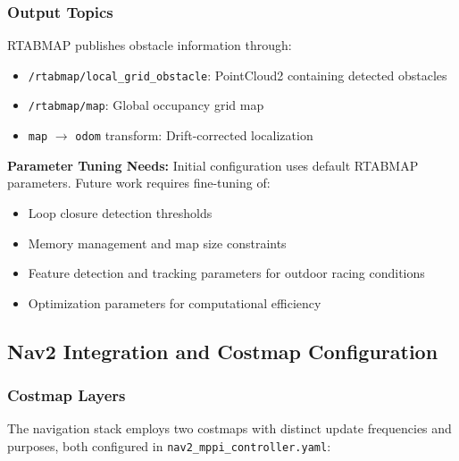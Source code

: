 \subsubsection{Output Topics}
RTABMAP publishes obstacle information through:
\begin{itemize}
    \item \texttt{/rtabmap/local\_grid\_obstacle}: PointCloud2 containing detected obstacles
    \item \texttt{/rtabmap/map}: Global occupancy grid map
    \item \texttt{map} $\rightarrow$ \texttt{odom} transform: Drift-corrected localization
\end{itemize}

\textbf{Parameter Tuning Needs:} Initial configuration uses default RTABMAP parameters. Future work requires fine-tuning of:
\begin{itemize}
    \item Loop closure detection thresholds
    \item Memory management and map size constraints
    \item Feature detection and tracking parameters for outdoor racing conditions
    \item Optimization parameters for computational efficiency
\end{itemize}

\subsection{Nav2 Integration and Costmap Configuration}

\subsubsection{Costmap Layers}
The navigation stack employs two costmaps with distinct update frequencies and purposes, both configured in \texttt{nav2\_mppi\_controller.yaml}:

